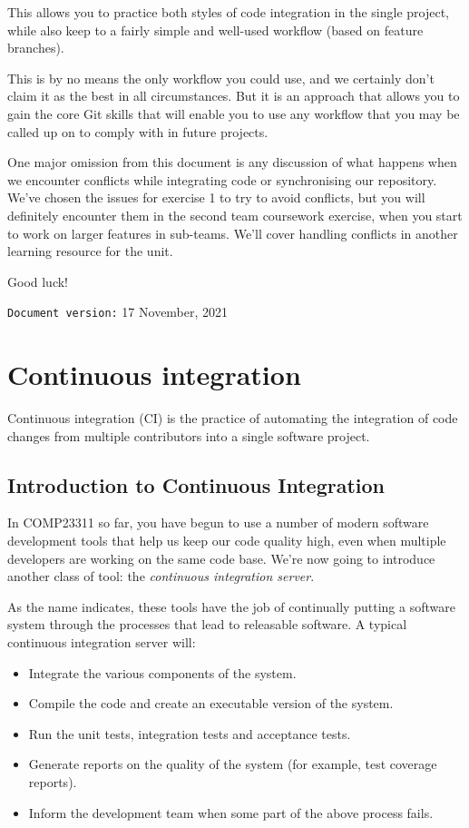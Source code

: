 \documentclass[
]{book}
\providecommand{\tightlist}{%
  \setlength{\itemsep}{0pt}\setlength{\parskip}{0pt}}
\begin{document}
This allows you to practice both styles of code integration in the single project, while also keep to a fairly simple and well-used workflow (based on feature branches).

This is by no means the only workflow you could use, and we certainly don't claim it as the best in all circumstances. But it is an approach that allows you to gain the core Git skills that will enable you to use any workflow that you may be called up on to comply with in future projects.

One major omission from this document is any discussion of what happens when we encounter conflicts while integrating code or synchronising our repository. We've chosen the issues for exercise 1 to try to avoid conflicts, but you will definitely encounter them in the second team coursework exercise, when you start to work on larger features in sub-teams. We'll cover handling conflicts in another learning resource for the unit.

Good luck!

\texttt{Document\ version:} 17 November, 2021

\hypertarget{integrating}{%
\chapter{Continuous integration}\label{integrating}}

Continuous integration (CI) is the practice of automating the integration of code changes from multiple contributors into a single software project.

\hypertarget{ici}{%
\section{Introduction to Continuous Integration}\label{ici}}

In COMP23311 so far, you have begun to use a number of modern software development tools that help us keep our code quality high, even when multiple developers are working on the same code base. We're now going to introduce another class of tool: the \emph{continuous integration server}.

As the name indicates, these tools have the job of continually putting a software system through the processes that lead to releasable software. A typical continuous integration server will:

\begin{itemize}
\tightlist
\item
  Integrate the various components of the system.
\item
  Compile the code and create an executable version of the system.
\item
  Run the unit tests, integration tests and acceptance tests.
\item
  Generate reports on the quality of the system (for example, test coverage reports).
\item
  Inform the development team when some part of the above process fails.
\end{itemize}
\end{document}
